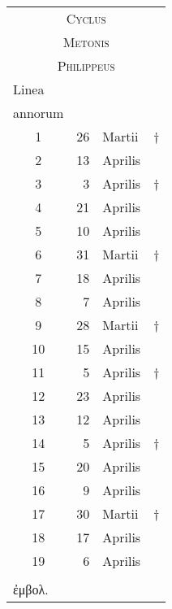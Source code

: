 \footnotesize
\centering
\begin{tabular}{@{}c r@{~}l l@{}}
\toprule
 \multicolumn{4}{c}{\Large\textsc{Cyclus}}\\
 \multicolumn{4}{c}{\Large\textsc{Metonis}}\\
 \multicolumn{4}{c}{\Large\textsc{Philippeus}}\\
\midrule
\multicolumn{1}{l}{\scriptsize{Linea}}
\\
\multicolumn{1}{l}{\scriptsize{annorum}}
\\
\midrule
  1 & 26 & Martii  & \scriptsize{†} \\
  2 & 13 & Aprilis \\
  3 &  3 & Aprilis & \scriptsize{†} \\
\midrule
  4 & 21 & Aprilis \\
  5 & 10 & Aprilis \\
  6 & 31 & Martii  & \scriptsize{†} \\
\midrule
  7 & 18 & Aprilis \\
  8 &  7 & Aprilis \\
  9 & 28 & Martii  & \scriptsize{†} \\
\midrule
 10 & 15 & Aprilis \\
 11 &  5 & Aprilis & \scriptsize{†} \\
 12 & 23 & Aprilis \\
\midrule
 13 & 12 & Aprilis \\
 14 &  5 & Aprilis & \scriptsize{†} \\
 15 & 20 & Aprilis \\
\midrule
 16 &  9 & Aprilis \\
 17 & 30 & Martii  & \scriptsize{†} \\
 18 & 17 & Aprilis \\
 19 &  6 & Aprilis \\
\bottomrule
\\
 \multicolumn{4}{l}{\footnotesize \super{†} \textgreek{ἐμβολ.}}\\
\end{tabular}
%
